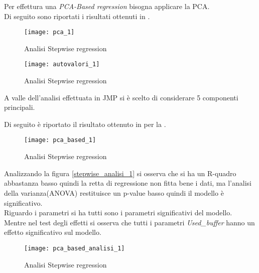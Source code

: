 Per effettura una \textit{PCA-Based regression} bisogna applicare la PCA.\\
Di seguito sono riportati i risultati ottenuti in .\\

\begin{figure}[!htbp]
  \centering
  \texttt{[image: pca\_1]}
  \caption{Analisi Stepwise regression}
  \label{pca_1}
\end{figure}

\begin{figure}[!htbp]
  \centering
  \texttt{[image: autovalori\_1]}
  \caption{Analisi Stepwise regression}
  \label{autovalori_1}
\end{figure}

A valle dell'analisi effettuata in JMP si è scelto di considerare 5 componenti
principali.\\

\clearpage

Di seguito è riportato il risultato ottenuto in  per
la .\\

\begin{figure}[!htbp]
  \centering
  \texttt{[image: pca\_based\_1]}
  \caption{Analisi Stepwise regression}
  \label{pca_based_1}
\end{figure}

\clearpage

Analizzando la figura \ref{stepwise_analisi_1} si osserva che si ha un R-quadro
abbastanza basso quindi la retta di regressione non fitta bene i dati, ma l'analisi
della varianza(ANOVA) restituisce un p-value basso quindi il modello è significativo.\\
Riguardo i parametri si ha tutti sono i parametri significativi
del modello.\\
Mentre nel test degli effetti si osserva che tutti i parametri \textit{Used\_buffer}
hanno un effetto significativo sul modello.\\

\begin{figure}[!htbp]
  \centering
  \texttt{[image: pca\_based\_analisi\_1]}
  \caption{Analisi Stepwise regression}
  \label{pca_based_analisi_1}
\end{figure}

\clearpage

